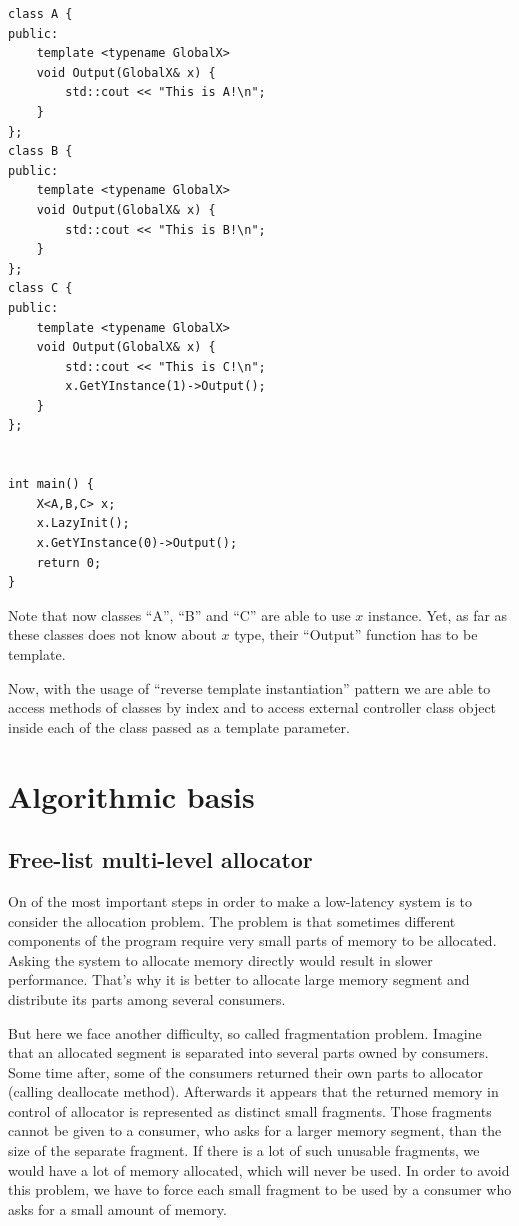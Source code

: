 \documentclass{article}
\begin{document}
\begin{lstlisting}
class A {
public:
    template <typename GlobalX>
    void Output(GlobalX& x) {
        std::cout << "This is A!\n";
    }
};
class B {
public:
    template <typename GlobalX>
    void Output(GlobalX& x) {
        std::cout << "This is B!\n";
    }
};
class C {
public:
    template <typename GlobalX>
    void Output(GlobalX& x) {
        std::cout << "This is C!\n";
        x.GetYInstance(1)->Output();
    }
};


int main() {
    X<A,B,C> x;
    x.LazyInit();
    x.GetYInstance(0)->Output();
    return 0;
}
\end{lstlisting}
Note that now classes ``A'', ``B'' and ``C'' are able to use $x$ instance. Yet, as far as these classes does not know about $x$ type, their ``Output'' function has to be template.

Now, with the usage of ``reverse template instantiation'' pattern we are able to access methods of classes by index and to access external controller class object inside each of the class passed as a template parameter.

\newpage
\section{Algorithmic basis}

\subsection{Free-list multi-level allocator}
\label{free_list_algo}

On of the most important steps in order to make a low-latency system is to consider the allocation problem. The problem is that sometimes different components of the program require very small parts of memory to be allocated. Asking the system to allocate memory directly would result in slower performance. That's why it is better to allocate large memory segment and distribute its parts among several consumers.

But here we face another difficulty, so called fragmentation problem. Imagine that an allocated segment is separated into several parts owned by consumers. Some time after, some of the consumers returned their own parts to allocator (calling deallocate method). Afterwards it appears that the returned memory in control of allocator is represented as distinct small fragments. Those fragments cannot be given to a consumer, who asks for a larger memory segment, than the size of the separate fragment. If there is a lot of such unusable fragments, we would have a lot of memory allocated, which will never be used. In order to avoid this problem, we have to force each small fragment to be used by a consumer who asks for a small amount of memory.
\end{document}
